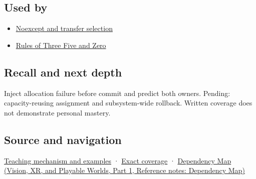 \subsection{Used by}\label{appendix-bea6beb5350f-used-by}

\hypertarget{appendix-bea6beb5350f-used-by}{}

\begin{itemize}
\tightlist
\item
  \hyperref[appendix-c746afaa47d1]{Noexcept and transfer selection}
\item
  \hyperref[appendix-7679107d057e]{Rules of Three Five and Zero}
\end{itemize}

\subsection{Recall and next depth}\label{appendix-bea6beb5350f-recall-and-next-depth}

\hypertarget{appendix-bea6beb5350f-recall-and-next-depth}{}

Inject allocation failure before commit and predict both owners. Pending: capacity-reusing assignment and subsystem-wide rollback. Written coverage does not demonstrate personal mastery.

\subsection{Source and navigation}\label{appendix-bea6beb5350f-source-and-navigation}

\hypertarget{appendix-bea6beb5350f-source-and-navigation}{}

\hyperref[01-foundations-i-ch003-replacing-a-value-is-not-creating-an-object]{Teaching mechanism and examples} · \hyperref[appendix-fd090d982a15-m009---parts-127-147]{Exact coverage} · \href{../07-Vision-XR-and-Playable-Worlds-P01/main.pdf\#nameddest=appendix-4ad47bdd269a}{Dependency Map (Vision, XR, and Playable Worlds, Part 1, Reference notes: Dependency Map)}
